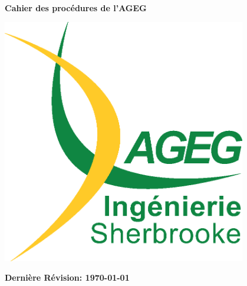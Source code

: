 \begin{titlepage}
\begin{center}

\vfill~\\[1cm]
{\Huge \bfseries Cahier des procédures de l'AGEG}

\vfill

\includegraphics[width=0.8\textwidth]{./Images/A11-LogoAGEG-002-AJC.eps}~\\[1cm]

\vfill

{\bfseries \LARGE Dernière Révision: \today}

\end{center}
\end{titlepage}

